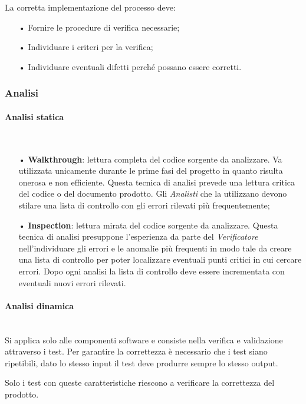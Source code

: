 {La corretta implementazione del processo deve:
\begin{itemize}
\item[•] Fornire le procedure di verifica necessarie; 
\item[•] Individuare i criteri per la verifica; 
\item[•] Individuare eventuali difetti perché possano essere corretti.
\end{itemize}

\subsubsection{Analisi}


\paragraph{Analisi statica}\mbox{}\\
\begin{itemize}
\item[•] \textbf{Walkthrough}: lettura completa del codice sorgente da analizzare. Va utilizzata unicamente durante le prime fasi del progetto in quanto risulta onerosa e non efficiente. Questa tecnica di analisi prevede una lettura critica del codice o del documento prodotto. Gli \textit{Analisti} che la utilizzano devono stilare una lista di controllo con gli errori rilevati più frequentemente;
\item[•] \textbf{Inspection}: lettura mirata del codice sorgente da analizzare. Questa tecnica di analisi presuppone l’esperienza da parte del \textit{Verificatore} nell’individuare gli errori e le anomalie più frequenti in modo tale da creare una lista di controllo per poter localizzare eventuali punti critici in cui cercare errori. Dopo ogni analisi la lista di controllo deve essere incrementata con eventuali nuovi errori rilevati.
\end{itemize}

\paragraph{Analisi dinamica}\mbox{}\\
Si applica solo alle componenti software e consiste nella verifica e validazione attraverso i test. Per garantire la correttezza è necessario che i test siano ripetibili, dato lo stesso input il test deve produrre sempre lo stesso output.  

Solo i test con queste caratteristiche riescono a verificare la correttezza del prodotto.

}
